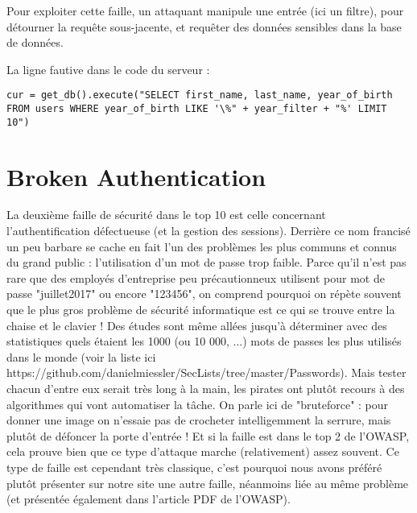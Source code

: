 \documentclass[a4paper,12pt]{article}
\begin{document}
Pour exploiter cette faille, un attaquant manipule une entrée (ici un filtre), pour détourner la requête sous-jacente, et requêter des données sensibles dans la base de données.

La ligne fautive dans le code du serveur :
\begin{lstlisting}
cur = get_db().execute("SELECT first_name, last_name, year_of_birth FROM users WHERE year_of_birth LIKE '\%" + year_filter + "%' LIMIT 10")
\end{lstlisting}


\section{Broken Authentication}
La deuxième faille de sécurité dans le top 10 est celle concernant l'authentification défectueuse (et la gestion des sessions). Derrière ce nom francisé un peu barbare se cache en fait l'un des problèmes les plus communs et connus du grand public : l'utilisation d'un mot de passe trop faible. Parce qu'il n'est pas rare que des employés d'entreprise peu précautionneux utilisent pour mot de passe "juillet2017" ou encore "123456", on comprend pourquoi on répète souvent que le plus gros problème de sécurité informatique est ce qui se trouve entre la chaise et le clavier !
Des études sont même allées jusqu'à déterminer avec des statistiques quels étaient les 1000 (ou 10 000, ...) mots de passes les plus utilisés dans le monde (voir la liste ici https://github.com/danielmiessler/SecLists/tree/master/Passwords). Mais tester chacun d'entre eux serait très long à la main, les pirates ont plutôt recours à des algorithmes qui vont automatiser la tâche. On parle ici de "bruteforce" : pour donner une image on n'essaie pas de crocheter intelligemment la serrure, mais plutôt de défoncer la porte d'entrée ! Et si la faille est dans le top 2 de l'OWASP, cela prouve bien que ce type d'attaque marche (relativement) assez souvent.
Ce type de faille est cependant très classique, c'est pourquoi nous avons préféré plutôt présenter sur notre site une autre faille, néanmoins liée au même problème (et présentée également dans l'article PDF de l'OWASP).
\end{document}
